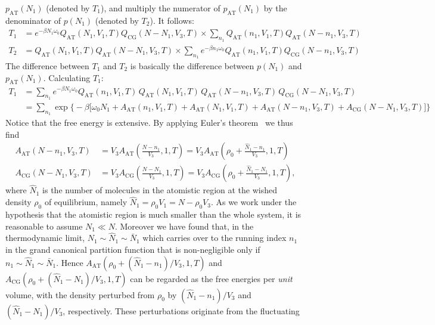 \documentclass[aip,jcp,a4paper,reprint,onecolumn]{revtex4-1}
\newcommand{\AT}{{\textrm{{AT}}}}
\newcommand{\CG}{{\textrm{CG}}}
\begin{document}
$p_{\AT}(N_1)$ (denoted by $T_1$),
and multiply the numerator of $p_{\AT}(N_1)$
by the denominator of $p(N_1)$ (denoted by $T_2$). It follows:
\begin{align}
  T_1
  &=
  e^{-\beta N_1\omega_0}
  Q_{\AT}(N_1,V_1,T) Q_{\CG}(N-N_1,V_3,T)
  \times
  \sum_{n_1}
  Q_{\AT}(n_1,V_1,T) Q_{\AT}(N-n_1,V_3,T)\\
  T_2
  &=
  Q_{\AT}(N_1,V_1,T) Q_{\AT}(N-N_1,V_3,T)
  \times
  \sum_{n_1}
  e^{-\beta n_1\omega_0}
  Q_{\AT}(n_1,V_1,T) Q_{\CG}(N-n_1,V_3,T)
\end{align}
The difference between $T_1$ and $T_2$ is basically the difference
between $p(N_1)$ and $p_{\AT}(N_1)$.
Calculating $T_1$:
\begin{align}\nonumber
  T_1
  &=
  \sum_{n_1}
  e^{-\beta N_1\omega_0}
  Q_{\AT}(n_1,V_1,T)\,
  Q_{\AT}(N_1,V_1,T)\,
  Q_{\AT}(N-n_1,V_3,T)\,
  Q_{\CG}(N-N_1,V_3,T) \\\label{eqn:t1-1}
  &=
  \sum_{n_1}
  \exp
  \big\{-\beta
  \big[
  \omega_0N_1 +
  A_{\AT}(n_1,V_1,T) +
  A_{\AT}(N_1,V_1,T) +
  A_{\AT}(N-n_1,V_3,T) +
  A_{\CG}(N-N_1,V_3,T)
  \big]
  \big\}
\end{align}
Notice that the free energy is extensive.
By applying Euler's theorem~\cite{tuckeman2010statistical} we thus find 
\begin{align}\label{eqn:Aat-0}
  A_{\AT}(N-n_1,V_3,T)
  &= V_3 A_{\AT}(\frac{N-n_1}{V_3},1,T)
  = V_3 A_{\AT}(\rho_0 + \frac{\hat N_1 - n_1}{V_3},1,T)\\\label{eqn:Acg-0}
  A_{\CG}(N-N_1,V_3,T)
  &= V_3 A_{\CG}(\frac{N-N_1}{V_3},1,T)
  = V_3 A_{\CG}(\rho_0 + \frac{\hat N_1 - N_1}{V_3},1,T),
\end{align}
where $\hat N_1$ is the number of molecules in the atomistic region
at the wished density $\rho_0$ of equilibrium, namely
$\hat N_1 = \rho_0V_1 = N - \rho_0 V_3$. As we work under the hypothesis that the atomistic region is much smaller than the whole system, it
is reasonable to assume $N_1\ll N$. Moreover we have found that, in the thermodynamic limit, $N_{1}\sim\hat N_1\sim\bar N_1$ which carries over to the running index $n_{1}$  in the grand canonical partition function that is non-negligible only if $n_{1}\sim\hat N_1\sim\bar N_1$. Hence 
$A_{\AT}(\rho_0 + (\hat N_1 - n_1)/{V_3},1,T)$ and
$A_{\CG}(\rho_0 + (\hat N_1 - N_1)/{V_3},1,T)$ can be regarded as
the free energies per \emph{unit} volume, with
the density perturbed from $\rho_0$ by  $(\hat N_1 - n_1)/{V_3}$
and $(\hat N_1 - N_1)/{V_3}$, respectively.
These perturbations originate from the fluctuating
\end{document}
